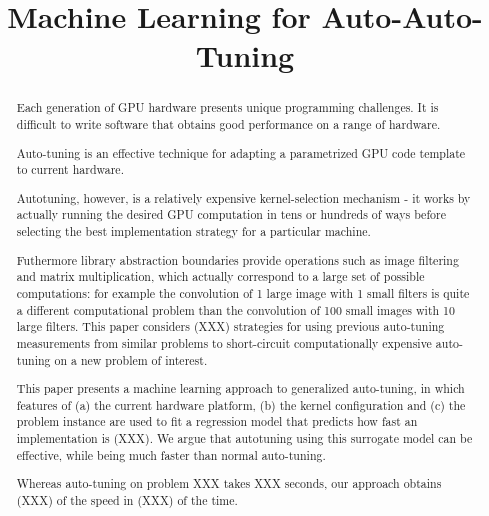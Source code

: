\documentclass{article}
\begin{document}
\title{Machine Learning for Auto-Auto-Tuning}
\begin{abstract}
Each generation of GPU hardware presents unique programming challenges.
It is difficult to write software that obtains good performance on a range of hardware.

Auto-tuning is an effective technique for adapting a parametrized
GPU code template to current hardware.

Autotuning, however, is a relatively expensive kernel-selection mechanism - it
works by actually running the desired GPU computation in tens or hundreds of
ways before selecting the best implementation strategy for a particular
machine.

Futhermore library abstraction boundaries provide operations such as image
filtering and matrix multiplication, which actually correspond to a large set
of possible computations: for example the convolution of 1 large image with 1
small filters is  quite a different computational problem than the convolution
of 100 small images with 10 large filters.
This paper considers (XXX) strategies for using previous auto-tuning
measurements from similar problems to short-circuit computationally
expensive auto-tuning on a new problem of interest.

This paper presents a machine learning approach to generalized auto-tuning, in
which features of
(a) the current hardware platform,
(b) the kernel configuration
and (c) the problem instance are used to fit a regression model that predicts
how fast an implementation is (XXX).
We argue that autotuning using this surrogate model can be effective, while
being much faster than normal auto-tuning.

Whereas auto-tuning on problem XXX takes XXX seconds, our approach obtains
(XXX) of the speed in (XXX) of the time.
\end{abstract}
\end{document}
